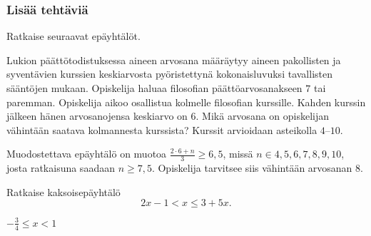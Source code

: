 \begin{tehtavasivu}
\subsubsection*{Lisää tehtäviä}

\begin{tehtava}
    Ratkaise seuraavat epäyhtälöt.
    \begin{vastaus}
    \end{vastaus}
\end{tehtava}

\begin{tehtava}
Lukion päättötodistuksessa aineen arvosana määräytyy aineen pakollisten ja syventävien kurssien keskiarvosta pyöristettynä kokonaisluvuksi tavallisten sääntöjen mukaan. Opiskelija haluaa filosofian päättöarvosanakseen $7$ tai paremman. Opiskelija aikoo osallistua kolmelle filosofian kurssille. Kahden kurssin jälkeen hänen arvosanojensa keskiarvo on $6$. Mikä arvosana on opiskelijan vähintään saatava kolmannesta kurssista? Kurssit arvioidaan asteikolla 
$4$--$10$.
\begin{vastaus}
Muodostettava epäyhtälö on muotoa $\frac{2\cdot 6+n}{3}\geq 6,5$, missä $n \in {4,5,6,7,8,9,10}$, josta ratkaisuna saadaan $n\geq 7,5$. Opiskelija tarvitsee siis vähintään arvosanan $8$.
\end{vastaus}
\end{tehtava}

\begin{tehtava}
Ratkaise kaksoisepäyhtälö
\[ 2x-1 < x \leq 3+5x.  \]
    \begin{vastaus}
        $-\frac{3}{4} \leq x < 1$
    \end{vastaus}
\end{tehtava}

\end{tehtavasivu}